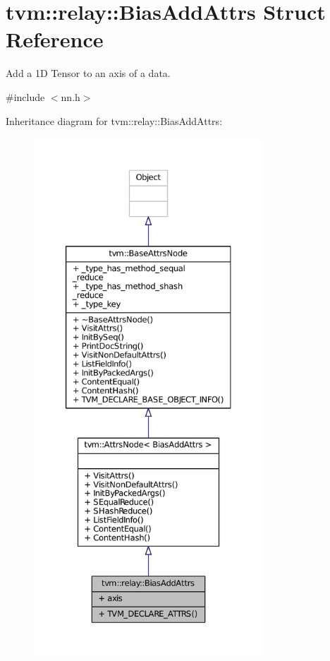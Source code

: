 \hypertarget{structtvm_1_1relay_1_1BiasAddAttrs}{}\section{tvm\+:\+:relay\+:\+:Bias\+Add\+Attrs Struct Reference}
\label{structtvm_1_1relay_1_1BiasAddAttrs}


Add a 1D Tensor to an axis of a data.  




{\ttfamily \#include $<$nn.\+h$>$}



Inheritance diagram for tvm\+:\+:relay\+:\+:Bias\+Add\+Attrs\+:
\nopagebreak
\begin{figure}[H]
\begin{center}
\leavevmode
\includegraphics[height=550pt]{structtvm_1_1relay_1_1BiasAddAttrs__inherit__graph}
\end{center}
\end{figure}


